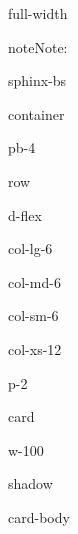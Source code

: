 \documentclass[letterpaper,10pt,english]{jupyterBook}
\begin{document}
\begin{sphinxuseclass}{full-width}
\begin{sphinxadmonition}{note}{Note:}
\begin{sphinxuseclass}{sphinx-bs}
\begin{sphinxuseclass}{container}
\begin{sphinxuseclass}{pb-4}
\begin{sphinxuseclass}{row}
\begin{sphinxuseclass}{d-flex}
\begin{sphinxuseclass}{col-lg-6}
\begin{sphinxuseclass}{col-md-6}
\begin{sphinxuseclass}{col-sm-6}
\begin{sphinxuseclass}{col-xs-12}
\begin{sphinxuseclass}{p-2}
\begin{sphinxuseclass}{card}
\begin{sphinxuseclass}{w-100}
\begin{sphinxuseclass}{shadow}
\begin{sphinxuseclass}{card-body}
\end{sphinxuseclass}
\end{sphinxuseclass}
\end{sphinxuseclass}
\end{sphinxuseclass}
\end{sphinxuseclass}
\end{sphinxuseclass}
\end{sphinxuseclass}
\end{sphinxuseclass}
\end{sphinxuseclass}
\end{sphinxuseclass}
\end{sphinxuseclass}
\end{sphinxuseclass}
\end{sphinxuseclass}
\end{sphinxuseclass}\end{sphinxadmonition}

\end{sphinxuseclass}
\end{document}

